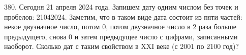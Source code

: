 380.  Сегодня 21 апреля 2024 года. Запишем дату одним числом без точек и пробелов: 21042024.
Заметим, что в таком виде дата состоит из пяти частей: некое двузначное число, потом 0, потом
двузначное число в 2 раза больше предыдущего, снова 0 и затем предыдущее число с цифрами,
записанными наоборот. Сколько дат с таким свойством в XXI веке (с 2001 по 2100 год)?\\
